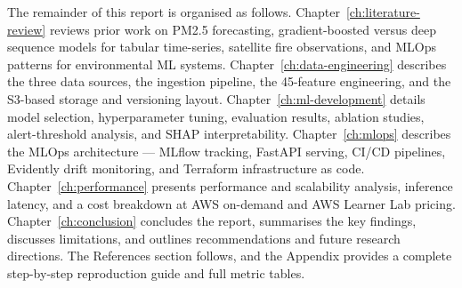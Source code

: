 The remainder of this report is organised as follows.
Chapter~\ref{ch:literature-review} reviews prior work on PM2.5
forecasting, gradient-boosted versus deep sequence models for tabular
time-series, satellite fire observations, and MLOps patterns for
environmental ML systems.
Chapter~\ref{ch:data-engineering} describes the three data sources, the
ingestion pipeline, the 45-feature engineering, and the S3-based storage
and versioning layout.
Chapter~\ref{ch:ml-development} details model selection, hyperparameter
tuning, evaluation results, ablation studies, alert-threshold analysis,
and SHAP interpretability.
Chapter~\ref{ch:mlops} describes the MLOps architecture ---
MLflow tracking, FastAPI serving, CI/CD pipelines, Evidently drift
monitoring, and Terraform infrastructure as code.
Chapter~\ref{ch:performance} presents performance and scalability
analysis, inference latency, and a cost breakdown at AWS on-demand and
AWS Learner Lab pricing.
Chapter~\ref{ch:conclusion} concludes the report, summarises the key
findings, discusses limitations, and outlines recommendations and
future research directions. The References section follows, and the
Appendix provides a complete step-by-step reproduction guide and full
metric tables.
